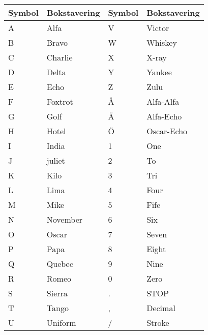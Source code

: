\begin{longtable}{ll|ll}
	\textbf{Symbol} & \textbf{Bokstavering} & \textbf{Symbol} & \textbf{Bokstavering} \\ \hline
	\endhead
	A               & Alfa                  & V               & Victor                \\
	B               & Bravo                 & W               & Whiskey               \\
	C               & Charlie               & X               & X-ray                 \\
	D               & Delta                 & Y               & Yankee                \\
	E               & Echo                  & Z               & Zulu                  \\
	F               & Foxtrot               & Å               & Alfa-Alfa             \\
	G               & Golf                  & Ä               & Alfa-Echo             \\
	H               & Hotel                 & Ö               & Oscar-Echo            \\
	I               & India                 & 1               & One                   \\
	J               & juliet                & 2               & To                    \\
	K               & Kilo                  & 3               & Tri                   \\
	L               & Lima                  & 4               & Four                  \\
	M               & Mike                  & 5               & Fife                  \\
	N               & November              & 6               & Six                   \\
	O               & Oscar                 & 7               & Seven                 \\
	P               & Papa                  & 8               & Eight                 \\
	Q               & Quebec                & 9               & Nine                  \\
	R               & Romeo                 & 0               & Zero                  \\
	S               & Sierra                & .               & STOP                  \\
	T               & Tango                 & ,               & Decimal               \\
	U               & Uniform               & /               & Stroke
\end{longtable}


